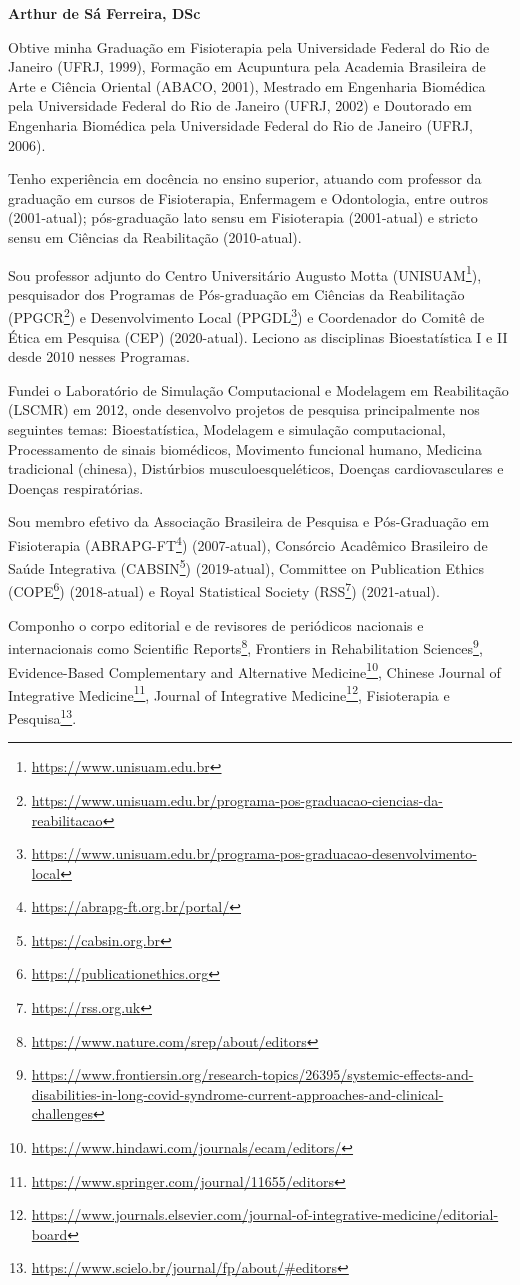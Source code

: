 \documentclass[
]{book}
\renewcommand{\href}[2]{#2\footnote{\url{#1}}}
\begin{document}
\textbf{Arthur de Sá Ferreira, DSc}

Obtive minha Graduação em Fisioterapia pela Universidade Federal do Rio de Janeiro (UFRJ, 1999), Formação em Acupuntura pela Academia Brasileira de Arte e Ciência Oriental (ABACO, 2001), Mestrado em Engenharia Biomédica pela Universidade Federal do Rio de Janeiro (UFRJ, 2002) e Doutorado em Engenharia Biomédica pela Universidade Federal do Rio de Janeiro (UFRJ, 2006).

Tenho experiência em docência no ensino superior, atuando com professor da graduação em cursos de Fisioterapia, Enfermagem e Odontologia, entre outros (2001-atual); pós-graduação lato sensu em Fisioterapia (2001-atual) e stricto sensu em Ciências da Reabilitação (2010-atual).

Sou professor adjunto do Centro Universitário Augusto Motta (\href{https://www.unisuam.edu.br}{UNISUAM}), pesquisador dos Programas de Pós-graduação em Ciências da Reabilitação (\href{https://www.unisuam.edu.br/programa-pos-graduacao-ciencias-da-reabilitacao}{PPGCR}) e Desenvolvimento Local (\href{https://www.unisuam.edu.br/programa-pos-graduacao-desenvolvimento-local}{PPGDL}) e Coordenador do Comitê de Ética em Pesquisa (CEP) (2020-atual). Leciono as disciplinas Bioestatística I e II desde 2010 nesses Programas.

Fundei o Laboratório de Simulação Computacional e Modelagem em Reabilitação (LSCMR) em 2012, onde desenvolvo projetos de pesquisa principalmente nos seguintes temas: Bioestatística, Modelagem e simulação computacional, Processamento de sinais biomédicos, Movimento funcional humano, Medicina tradicional (chinesa), Distúrbios musculoesqueléticos, Doenças cardiovasculares e Doenças respiratórias.

Sou membro efetivo da Associação Brasileira de Pesquisa e Pós-Graduação em Fisioterapia (\href{https://abrapg-ft.org.br/portal/}{ABRAPG-FT}) (2007-atual), Consórcio Acadêmico Brasileiro de Saúde Integrativa (\href{https://cabsin.org.br}{CABSIN}) (2019-atual), Committee on Publication Ethics (\href{https://publicationethics.org}{COPE}) (2018-atual) e Royal Statistical Society (\href{https://rss.org.uk}{RSS}) (2021-atual).

Componho o corpo editorial e de revisores de periódicos nacionais e internacionais como \href{https://www.nature.com/srep/about/editors}{Scientific Reports}, \href{https://www.frontiersin.org/research-topics/26395/systemic-effects-and-disabilities-in-long-covid-syndrome-current-approaches-and-clinical-challenges}{Frontiers in Rehabilitation Sciences}, \href{https://www.hindawi.com/journals/ecam/editors/}{Evidence-Based Complementary and Alternative Medicine}, \href{https://www.springer.com/journal/11655/editors}{Chinese Journal of Integrative Medicine}, \href{https://www.journals.elsevier.com/journal-of-integrative-medicine/editorial-board}{Journal of Integrative Medicine}, \href{https://www.scielo.br/journal/fp/about/\#editors}{Fisioterapia e Pesquisa}.
\end{document}
